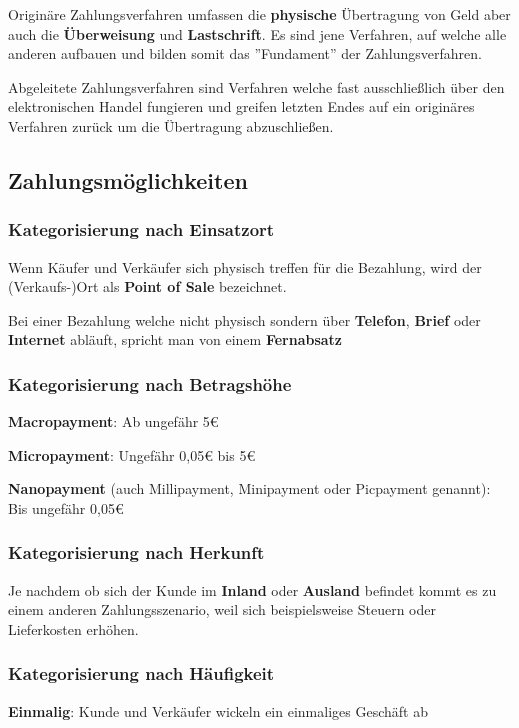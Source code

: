 Originäre Zahlungsverfahren umfassen die \textbf{physische} Übertragung von Geld aber auch die \textbf{Überweisung} und \textbf{Lastschrift}. Es sind jene Verfahren, auf welche alle anderen aufbauen und bilden somit das ''Fundament'' der Zahlungsverfahren.

Abgeleitete Zahlungsverfahren sind Verfahren welche fast ausschließlich über den elektronischen Handel fungieren und greifen letzten Endes auf ein originäres Verfahren zurück um die Übertragung abzuschließen.

\clearpage
\subsection{Zahlungsmöglichkeiten}
\subsubsection{Kategorisierung nach Einsatzort}
Wenn Käufer und Verkäufer sich physisch treffen für die Bezahlung, wird der (Verkaufs-)Ort als \textbf{Point of Sale} bezeichnet.

Bei einer Bezahlung welche nicht physisch sondern über \textbf{Telefon}, \textbf{Brief} oder \textbf{Internet} abläuft, spricht man von einem \textbf{Fernabsatz}

\subsubsection{Kategorisierung nach Betragshöhe}
\textbf{Macropayment}: Ab ungefähr 5€

\textbf{Micropayment}: Ungefähr 0,05€ bis 5€

\textbf{Nanopayment} (auch Millipayment, Minipayment oder Picpayment genannt): Bis ungefähr 0,05€ 

\subsubsection{Kategorisierung nach Herkunft}
Je nachdem ob sich der Kunde im \textbf{Inland} oder \textbf{Ausland} befindet kommt es zu einem anderen Zahlungsszenario, weil sich beispielsweise Steuern oder Lieferkosten erhöhen.


\subsubsection{Kategorisierung nach Häufigkeit}
\textbf{Einmalig}: Kunde und Verkäufer wickeln ein einmaliges Geschäft ab

